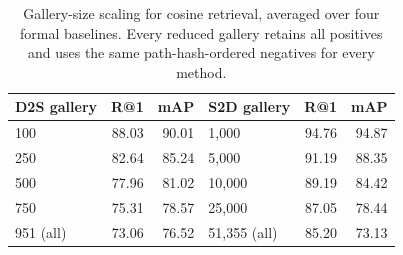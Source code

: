 \begin{table}[!t]
\centering
\small
\caption{Gallery-size scaling for cosine retrieval, averaged over four formal
baselines. Every reduced gallery retains all positives and uses the same
path-hash-ordered negatives for every method.}
\label{tab:formal-gallery-scale}
\begin{tabular}{lrr@{\qquad}lrr}
\toprule
D2S gallery & R@1 & mAP & S2D gallery & R@1 & mAP \\
\midrule
100      & 88.03 & 90.01 & 1,000  & 94.76 & 94.87 \\
250      & 82.64 & 85.24 & 5,000  & 91.19 & 88.35 \\
500      & 77.96 & 81.02 & 10,000 & 89.19 & 84.42 \\
750      & 75.31 & 78.57 & 25,000 & 87.05 & 78.44 \\
951 (all)& 73.06 & 76.52 & 51,355 (all)& 85.20 & 73.13 \\
\bottomrule
\end{tabular}
\end{table}
